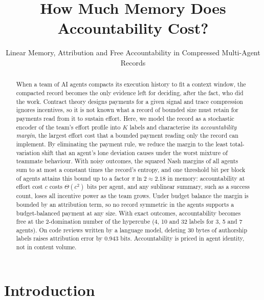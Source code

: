 \documentclass[sigconf,anonymous,acmthm=false]{acmart}
\theoremstyle{acmplain}
\theoremstyle{acmdefinition}
\begin{document}
\title{How Much Memory Does Accountability Cost?}
\subtitle{Linear Memory, Attribution and Free Accountability in Compressed Multi-Agent Records}

\begin{abstract}
When a team of AI agents compacts its execution history to fit a context window, the
compacted record becomes the only evidence left for deciding, after the fact, who did the
work. Contract theory designs payments for a given signal and trace compression ignores
incentives, so it is not known what a record of bounded size must retain for payments read
from it to sustain effort. Here, we model the record as a stochastic encoder of the team's
effort profile into $K$ labels and characterise its \emph{accountability margin}, the
largest effort cost that a bounded payment reading only the record can implement. By
eliminating the payment rule, we reduce the margin to the least total-variation shift that
an agent's lone deviation causes under the worst mixture of teammate behaviour. With noisy
outcomes, the squared Nash margins of all agents sum to at most a constant times the record's
entropy, and one threshold bit per block of agents attains this bound up to a factor
$\pi\ln2\approx2.18$ in memory: accountability at effort cost $c$ costs $\Theta(c^2)$ bits per
agent, and any sublinear summary, such as a success count, loses all incentive power as the
team grows. Under budget balance the margin is bounded by an attribution term, so no record
symmetric in the agents supports a budget-balanced payment at any size. With exact outcomes,
accountability becomes free at the 2-domination number of the hypercube (4, 10 and 32 labels
for 3, 5 and 7 agents). On code reviews written by a language model, deleting 30 bytes of
authorship labels raises attribution error by 0.943 bits. Accountability is priced in agent
identity, not in content volume.
\end{abstract}


\maketitle

\section{Introduction}\label{sec:intro}
\end{document}
